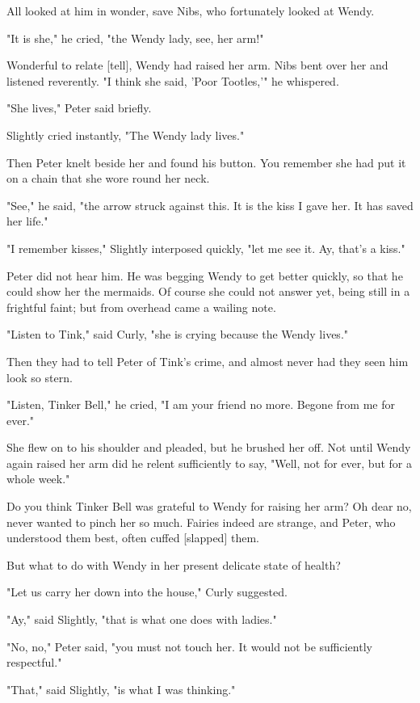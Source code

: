 All looked at him in wonder, save Nibs, who fortunately looked at Wendy.


"It is she," he cried, "the Wendy lady, see, her arm!"


Wonderful to relate [tell], Wendy had raised her arm. Nibs bent over her
and listened reverently. "I think she said, 'Poor Tootles,'" he whispered.


"She lives," Peter said briefly.


Slightly cried instantly, "The Wendy lady lives."


Then Peter knelt beside her and found his button. You remember she had put
it on a chain that she wore round her neck.


"See," he said, "the arrow struck against this. It is the kiss I gave her.
It has saved her life."


"I remember kisses," Slightly interposed quickly, "let me see it. Ay,
that's a kiss."


Peter did not hear him. He was begging Wendy to get better quickly, so
that he could show her the mermaids. Of course she could not answer yet,
being still in a frightful faint; but from overhead came a wailing note.


"Listen to Tink," said Curly, "she is crying because the Wendy lives."


Then they had to tell Peter of Tink's crime, and almost never had they
seen him look so stern.


"Listen, Tinker Bell," he cried, "I am your friend no more. Begone from me
for ever."


She flew on to his shoulder and pleaded, but he brushed her off. Not until
Wendy again raised her arm did he relent sufficiently to say, "Well, not
for ever, but for a whole week."


Do you think Tinker Bell was grateful to Wendy for raising her arm? Oh
dear no, never wanted to pinch her so much. Fairies indeed are strange,
and Peter, who understood them best, often cuffed [slapped] them.


But what to do with Wendy in her present delicate state of health?


"Let us carry her down into the house," Curly suggested.


"Ay," said Slightly, "that is what one does with ladies."


"No, no," Peter said, "you must not touch her. It would not be
sufficiently respectful."


"That," said Slightly, "is what I was thinking."


